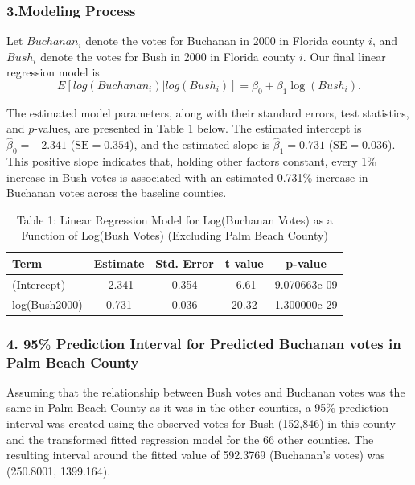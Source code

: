 \documentclass[
  letterpaper,
  DIV=11,
  numbers=noendperiod]{scrartcl}
\begin{document}
\subsubsection{3.Modeling Process}\label{modeling-process}

Let \(Buchanan_i\) denote the votes for Buchanan in 2000 in Florida
county \(i\), and \(Bush_i\) denote the votes for Bush in 2000 in
Florida county \(i\). Our final linear regression model is
\[E[log(Buchanan_i) | log(Bush_i)] = \beta_0 + \beta_1\log(Bush_i).\]

The estimated model parameters, along with their standard errors, test
statistics, and \(p\)-values, are presented in Table 1 below. The
estimated intercept is \(\hat{\beta}_0 = -2.341\)
(\(\text{SE} = 0.354\)), and the estimated slope is
\(\hat{\beta}_1 = 0.731\) (\(\text{SE} = 0.036\)). This positive slope
indicates that, holding other factors constant, every 1\% increase in
Bush votes is associated with an estimated 0.731\% increase in Buchanan
votes across the baseline counties.

\begin{table}[H]
\centering
\caption{\label{tab:unnamed-chunk-2}Table 1: Linear Regression Model for Log(Buchanan Votes) as a Function of Log(Bush Votes) (Excluding Palm Beach County)}
\centering
\begin{tabular}[t]{lcccc}
\toprule
Term & Estimate & Std. Error & t value & p-value\\
\midrule
(Intercept) & -2.341 & 0.354 & -6.61 & 9.070663e-09\\
log(Bush2000) & 0.731 & 0.036 & 20.32 & 1.300000e-29\\
\bottomrule
\end{tabular}
\end{table}

\subsubsection{4. 95\% Prediction Interval for Predicted Buchanan votes
in Palm Beach
County}\label{prediction-interval-for-predicted-buchanan-votes-in-palm-beach-county}

Assuming that the relationship between Bush votes and Buchanan votes was
the same in Palm Beach County as it was in the other counties, a 95\%
prediction interval was created using the observed votes for Bush
(152,846) in this county and the transformed fitted regression model for
the 66 other counties. The resulting interval around the fitted value of
592.3769 (Buchanan's votes) was (250.8001, 1399.164).
\end{document}
